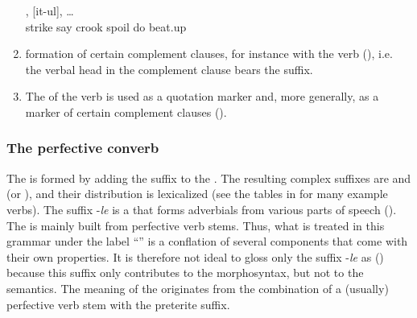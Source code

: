 \begin{enumerate}
\begin{exe}
		\ex	\label{ex:‎‎hitting with the crook, disturbing, beating up}
		,	[it-ul], \ldots\\
			strike	say	crook	spoil	do		beat.up\\
		\glt	{}
	\end{exe}

	\item	formation of certain complement clauses, for instance with the verb  (), i.e. the verbal head in the complement clause bears the  suffix.

	\item	The  of the verb   is used as a quotation marker and, more generally, as a marker of certain complement clauses ().

\end{enumerate}


\subsubsection{The perfective converb}
\label{sssec:The perfective converb}

The  is formed by adding the suffix  to the . The resulting complex suffixes are  and  (or ), and their distribution is lexicalized (see the tables in  for many example verbs). The suffix -\textit{le} is a  that forms adverbials from various parts of speech (). The  is mainly built from perfective verb stems. Thus, what is treated in this grammar under the label ``'' is a conflation of several components that come with their own properties. It is therefore not ideal to gloss only the suffix -\textit{le} as  () because this suffix only contributes to the morphosyntax, but not to the semantics. The meaning of the  originates from the combination of a (usually) perfective verb stem with the preterite suffix.

